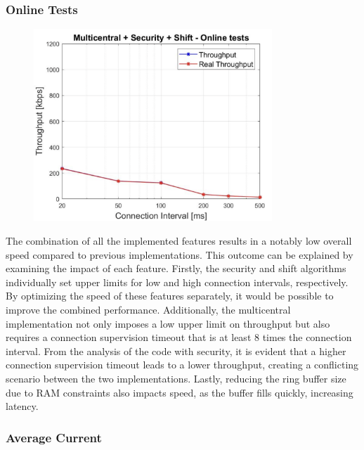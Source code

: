 \documentclass{Configuration_Files/PoliMi3i_thesis}
\begin{document}
\subsubsection*{Online Tests}

\begin{figure}[H]
    \centering
    \includegraphics[width=0.8\textwidth]{Results Manuel/figure31}
    \label{fig:figure1}
\end{figure}

The combination of all the implemented features results in a notably low overall speed compared to previous implementations. This outcome can be explained by examining the impact of each feature. Firstly, the security and shift algorithms individually set upper limits for low and high connection intervals, respectively. By optimizing the speed of these features separately, it would be possible to improve the combined performance. Additionally, the multicentral implementation not only imposes a low upper limit on throughput but also requires a connection supervision timeout that is at least 8 times the connection interval. From the analysis of the code with security, it is evident that a higher connection supervision timeout leads to a lower throughput, creating a conflicting scenario between the two implementations. Lastly, reducing the ring buffer size due to RAM constraints also impacts speed, as the buffer fills quickly, increasing latency.

\subsubsection*{Average Current}
\end{document}
